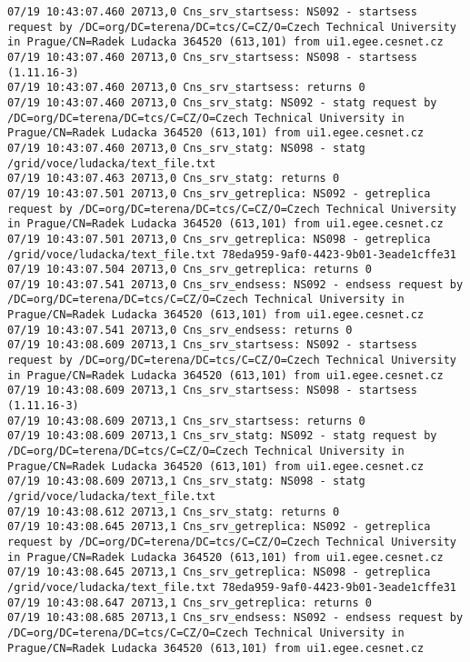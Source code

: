 \documentclass[a4paper, 11pt]{article} %
\begin{document}
\begin{lstlisting}[label={log:del3},caption={lcg-del -a lfn:/grid/voce/ludacka/text\_file.txt - deletes all replicas and alisses. In this example: deletes 2 replicas}] 
07/19 10:43:07.460 20713,0 Cns_srv_startsess: NS092 - startsess request by /DC=org/DC=terena/DC=tcs/C=CZ/O=Czech Technical University in Prague/CN=Radek Ludacka 364520 (613,101) from ui1.egee.cesnet.cz
07/19 10:43:07.460 20713,0 Cns_srv_startsess: NS098 - startsess (1.11.16-3)
07/19 10:43:07.460 20713,0 Cns_srv_startsess: returns 0
07/19 10:43:07.460 20713,0 Cns_srv_statg: NS092 - statg request by /DC=org/DC=terena/DC=tcs/C=CZ/O=Czech Technical University in Prague/CN=Radek Ludacka 364520 (613,101) from ui1.egee.cesnet.cz
07/19 10:43:07.460 20713,0 Cns_srv_statg: NS098 - statg /grid/voce/ludacka/text_file.txt 
07/19 10:43:07.463 20713,0 Cns_srv_statg: returns 0
07/19 10:43:07.501 20713,0 Cns_srv_getreplica: NS092 - getreplica request by /DC=org/DC=terena/DC=tcs/C=CZ/O=Czech Technical University in Prague/CN=Radek Ludacka 364520 (613,101) from ui1.egee.cesnet.cz
07/19 10:43:07.501 20713,0 Cns_srv_getreplica: NS098 - getreplica /grid/voce/ludacka/text_file.txt 78eda959-9af0-4423-9b01-3eade1cffe31
07/19 10:43:07.504 20713,0 Cns_srv_getreplica: returns 0
07/19 10:43:07.541 20713,0 Cns_srv_endsess: NS092 - endsess request by /DC=org/DC=terena/DC=tcs/C=CZ/O=Czech Technical University in Prague/CN=Radek Ludacka 364520 (613,101) from ui1.egee.cesnet.cz
07/19 10:43:07.541 20713,0 Cns_srv_endsess: returns 0
07/19 10:43:08.609 20713,1 Cns_srv_startsess: NS092 - startsess request by /DC=org/DC=terena/DC=tcs/C=CZ/O=Czech Technical University in Prague/CN=Radek Ludacka 364520 (613,101) from ui1.egee.cesnet.cz
07/19 10:43:08.609 20713,1 Cns_srv_startsess: NS098 - startsess (1.11.16-3)
07/19 10:43:08.609 20713,1 Cns_srv_startsess: returns 0
07/19 10:43:08.609 20713,1 Cns_srv_statg: NS092 - statg request by /DC=org/DC=terena/DC=tcs/C=CZ/O=Czech Technical University in Prague/CN=Radek Ludacka 364520 (613,101) from ui1.egee.cesnet.cz
07/19 10:43:08.609 20713,1 Cns_srv_statg: NS098 - statg /grid/voce/ludacka/text_file.txt 
07/19 10:43:08.612 20713,1 Cns_srv_statg: returns 0
07/19 10:43:08.645 20713,1 Cns_srv_getreplica: NS092 - getreplica request by /DC=org/DC=terena/DC=tcs/C=CZ/O=Czech Technical University in Prague/CN=Radek Ludacka 364520 (613,101) from ui1.egee.cesnet.cz
07/19 10:43:08.645 20713,1 Cns_srv_getreplica: NS098 - getreplica /grid/voce/ludacka/text_file.txt 78eda959-9af0-4423-9b01-3eade1cffe31
07/19 10:43:08.647 20713,1 Cns_srv_getreplica: returns 0
07/19 10:43:08.685 20713,1 Cns_srv_endsess: NS092 - endsess request by /DC=org/DC=terena/DC=tcs/C=CZ/O=Czech Technical University in Prague/CN=Radek Ludacka 364520 (613,101) from ui1.egee.cesnet.cz

\end{lstlisting}
\end{document}
